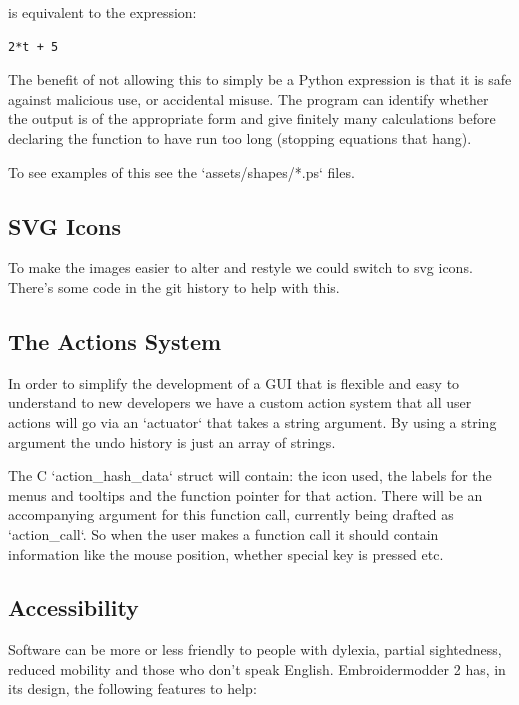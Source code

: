 \documentclass{report}
\begin{document}
is equivalent to the expression:

\begin{verbatim}
2*t + 5
\end{verbatim}

The benefit of not allowing this to simply be a Python expression
is that it is safe against malicious use, or accidental misuse.
The program can identify whether the output is of the appropriate
form and give finitely many calculations before declaring the
function to have run too long (stopping equations that hang).

To see examples of this see the `assets/shapes/*.ps` files.

\subsection{SVG Icons}

To make the images easier to alter and restyle we could
switch to svg icons. There's some code in the git history
to help with this.

\subsection{The Actions System}

In order to simplify the development of a GUI that is flexible and
easy to understand to new developers we have a custom action system that all
user actions will go via an `actuator` that takes a string argument. By using a
string argument the undo history is just an array of strings.

The C `action\_hash\_data` struct will contain: the icon used, the labels for the
menus and tooltips and the function pointer for that action.
There will be an accompanying argument for this function call, currently being
drafted as `action\_call`. So when the user makes a function call it should
contain information like the mouse position, whether special key is pressed
etc.

\subsection{Accessibility}

Software can be more or less friendly to people with dylexia, partial sightedness, reduced mobility and those who don't speak English. Embroidermodder 2 has, in its design, the following features to help:
\end{document}

